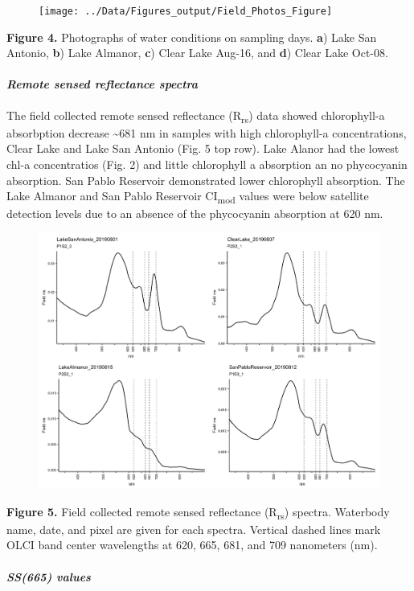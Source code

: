 \documentclass[]{article}
\let\oldparagraph\paragraph
\renewcommand{\paragraph}[1]{\oldparagraph{#1}\mbox{}}
\begin{document}
\begin{figure}
\texttt{[image: ../Data/Figures\_output/Field\_Photos\_Figure]} \end{figure}

\textbf{Figure 4.} Photographs of water conditions on sampling days.
\textbf{a}) Lake San Antonio, \textbf{b}) Lake Almanor, \textbf{c})
Clear Lake Aug-16, and \textbf{d}) Clear Lake Oct-08.

\paragraph{\texorpdfstring{\emph{Remote sensed reflectance
spectra}}{Remote sensed reflectance spectra}}\label{remote-sensed-reflectance-spectra}

The field collected remote sensed reflectance (R\textsubscript{rs}) data
showed chlorophyll-a absorbption decrease \textasciitilde{}681 nm in
samples with high chlorophyll-a concentrations, Clear Lake and Lake San
Antonio (Fig. 5 top row). Lake Alanor had the lowest chl-a concentratios
(Fig. 2) and little chlorophyll a absorption an no phycocyanin
absorption. San Pablo Reservoir demonstrated lower chlorophyll
absorption. The Lake Almanor and San Pablo Reservoir
CI\textsubscript{mod} values were below satellite detection levels due
to an absence of the phycocyanin absorption at 620 nm.

\begin{figure}
\includegraphics[width=0.5\linewidth]{../Data/Figures_output/RRS_Spectra_Figure} \end{figure}

\textbf{Figure 5.} Field collected remote sensed reflectance
(R\textsubscript{rs}) spectra. Waterbody name, date, and pixel are given
for each spectra. Vertical dashed lines mark OLCI band center
wavelengths at 620, 665, 681, and 709 nanometers (nm).

\paragraph{\texorpdfstring{\emph{SS(665)
values}}{SS(665) values}}\label{ss665-values}
\end{document}
